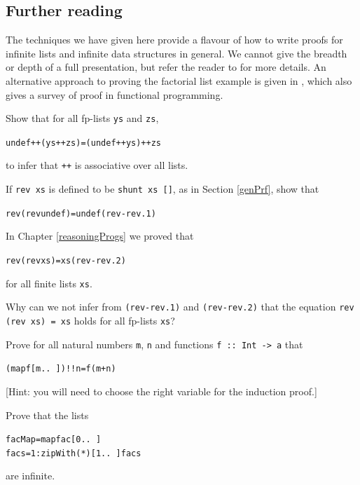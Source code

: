 \subsection*{Further reading}

The techniques we have given here provide a flavour of how to write
proofs for
infinite lists and infinite data structures in general. We cannot give the
breadth or depth of a full presentation, but refer the reader to 
 for
more details. An alternative approach to proving the factorial list
example is given in , which also gives a survey of proof
in functional programming.



\begin{exercises}

\item
Show that for all fp-lists \texttt{ys} and \texttt{zs},
\begin{alltt}
undef ++ (ys ++ zs)  = (undef ++ ys) ++ zs
\end{alltt}
to infer that \texttt{++} is associative over all lists.

\item
If \texttt{rev xs} is defined to be \texttt{shunt xs []}, as
in Section \ref{genPrf}, show that
\begin{alltt}
rev (rev undef) = undef \hfill (rev-rev.1)
\end{alltt}
In Chapter \ref{reasoningProgs} we proved that 
\begin{alltt}
rev (rev xs) = xs \hfill (rev-rev.2)
\end{alltt}
for all
finite lists \texttt{xs}. 

Why can we not infer from \texttt{(rev-rev.1)} and \texttt{(rev-rev.2)}
that the equation \texttt{rev (rev xs) = xs} holds for all fp-lists \texttt{xs}? 

\item
Prove for all natural numbers \texttt{m}, \texttt{n} and functions 
\texttt{f ::\ Int -> a} that 
\begin{alltt}
(map f [m ..\ ])!!n = f (m+n)
\end{alltt}
[Hint: you will need to choose the right variable for the induction proof.]

\item
Prove that the lists
\begin{alltt}
facMap = map fac [0 ..\ ]
facs = 1 : zipWith (*) [1 ..\ ] facs
\end{alltt}
are infinite.


\end{exercises}
